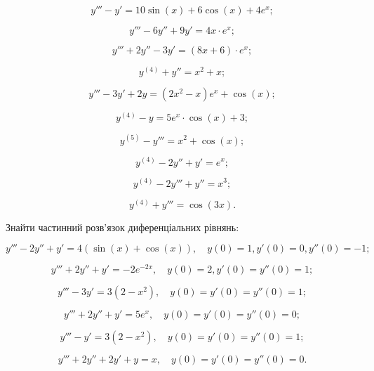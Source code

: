 \begin{multicols}{2}
\begin{problem}
	\[y'''-y'=10\sin(x)+6\cos(x)+4e^x;\]
\end{problem}
\begin{problem}
	\[y'''-6y''+9y'=4x\cdot e^x;\]
\end{problem}
\begin{problem}
	\[y'''+2y''-3y'=(8x+6)\cdot e^x;\]
\end{problem}
\begin{problem}
	\[y^{(4)}+y''=x^2+x;\]
\end{problem}
\begin{problem}
	\[y'''-3y'+2y=(2x^2-x) e^x+\cos(x);\]
\end{problem}
\begin{problem}
	\[y^{(4)}-y=5e^x\cdot\cos(x)+3;\]
\end{problem}
\begin{problem}
	\[y^{(5)}-y'''=x^2+\cos(x);\]
\end{problem}
\begin{problem}
	\[y^{(4)}-2y''+y'=e^x;\]
\end{problem}
\begin{problem}
	\[y^{(4)}-2y'''+y''=x^3;\]
\end{problem}
\begin{problem}
	\[y^{(4)}+y'''=\cos(3x).\]
\end{problem}
\end{multicols}

Знайти частинний розв'язок диференціальних рівнянь:
\begin{problem}
	\[y'''-2y''+y'=4(\sin(x)+\cos(x)),\quad y(0)=1,y'(0)=0,y''(0)=-1;\]
\end{problem}
\begin{problem}
	\[y'''+2y''+y'=-2e^{-2x},\quad y(0)=2,y'(0)=y''(0)=1;\]
\end{problem}
\begin{problem}
	\[y'''-3y'=3(2-x^2),\quad y(0)=y'(0)=y''(0)=1;\]
\end{problem}
\begin{problem}
	\[y'''+2y''+y'=5e^x,\quad y(0)=y'(0)=y''(0)=0;\]
\end{problem}
\begin{problem}
	\[y'''-y'=3(2-x^2),\quad y(0)=y'(0)=y''(0)=1;\]
\end{problem}
\begin{problem}
	\[y'''+2y''+2y'+y=x,\quad y(0)=y'(0)=y''(0)=0.\]
\end{problem}
